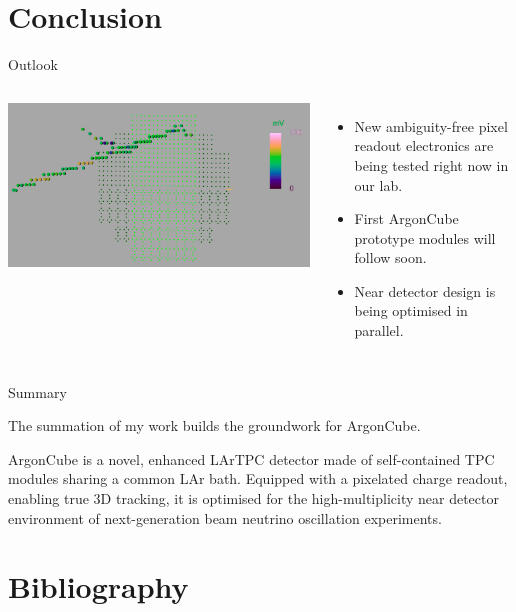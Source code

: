 \documentclass[]{beamer}
\newcommand*{\AC}{{ArgonCube}}
\newcommand*{\lar}{{LAr}}
\newcommand*{\lartpc}{{LArTPC}}
\begin{document}
\section{Conclusion}

\begin{frame}{Outlook}
	\begin{columns}[c]
		\centering
		\includegraphics[width=\textwidth]{defence/larpix_event}
		\begin{itemize}
			\item New ambiguity-free pixel readout electronics are being tested right now in our lab.
			\item First \AC{} prototype modules will follow soon.
			\item Near detector design is being optimised in parallel.
		\end{itemize}
	\end{columns}
\end{frame}

\begin{frame}{Summary}
	\begin{block}{}
		The summation of my work builds the groundwork for \AC{}.
	\end{block}
	
	\begin{block}{}
		\AC{} is a novel, enhanced \lartpc{} detector made of self-contained TPC modules sharing a common \lar{} bath.
		Equipped with a pixelated charge readout, enabling true 3D tracking, it is optimised for the high-multiplicity near detector environment of next-generation beam neutrino oscillation experiments.
	\end{block}
\end{frame}

\appendix

\section{Bibliography}
\end{document}
